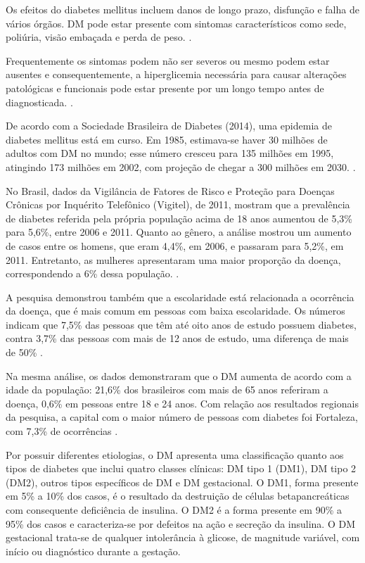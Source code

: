 Os efeitos do diabetes mellitus incluem danos de longo prazo, disfunção e falha de vários órgãos. DM pode estar presente com sintomas característicos como sede, poliúria, visão embaçada e perda de peso. \cite{assal1999definition}.

Frequentemente os sintomas podem não ser severos ou mesmo podem estar ausentes e consequentemente, a hiperglicemia  necessária para causar alterações patológicas e funcionais pode estar presente por um longo tempo antes de diagnosticada. \cite{assal1999definition}.

De acordo com a Sociedade Brasileira de Diabetes (2014), uma epidemia de diabetes mellitus está em curso. Em 1985, estimava-se haver 30 milhões de adultos com DM no mundo; esse número cresceu para 135 milhões em 1995, atingindo 173 milhões em 2002, com projeção de chegar a 300 milhões em 2030. \cite{sarah2004global}.

No Brasil, dados da Vigilância de Fatores de Risco e Proteção para Doenças Crônicas por Inquérito Telefônico (Vigitel), de 2011, mostram que a prevalência de diabetes referida pela própria  população acima de 18 anos aumentou de 5,3\% para 5,6\%, entre 2006 e 2011. Quanto ao gênero, a análise mostrou um aumento de casos entre os homens, que eram 4,4\%, em 2006, e passaram para 5,2\%, em 2011. Entretanto, as mulheres apresentaram uma maior proporção da doença, correspondendo a 6\% dessa população. \cite{monteiro2007vigitel}.

A pesquisa demonstrou também que a escolaridade está relacionada a ocorrência da doença, que é mais comum em pessoas com baixa escolaridade. Os números indicam que 7,5\% das pessoas que têm até oito anos de estudo possuem diabetes, contra 3,7\% das pessoas com mais de 12 anos de estudo, uma diferença de mais de 50\% \cite{monteiro2007vigitel}.

Na mesma análise, os dados demonstraram que o DM aumenta de acordo com a idade da população: 21,6\% dos brasileiros com mais de 65 anos referiram a doença, 0,6\% em pessoas entre 18 e 24 anos. Com relação aos resultados regionais da pesquisa, a capital com o maior número de pessoas com diabetes foi Fortaleza, com 7,3\% de ocorrências \cite{monteiro2007vigitel}.

Por possuir diferentes etiologias, o DM apresenta uma classificação quanto aos tipos de diabetes que inclui quatro classes clínicas: DM tipo 1 (DM1), DM tipo 2 (DM2), outros tipos específicos de DM e DM gestacional. O DM1, forma presente em 5\% a 10\% dos casos, é o resultado da destruição de células betapancreáticas com consequente deficiência de insulina. O DM2 é a forma presente em 90\% a 95\% dos casos e caracteriza-se por defeitos na ação e secreção da insulina. O DM gestacional trata-se de qualquer intolerância à glicose, de magnitude variável, com início ou diagnóstico durante a gestação. \cite{sociedade2009diretrizes}

